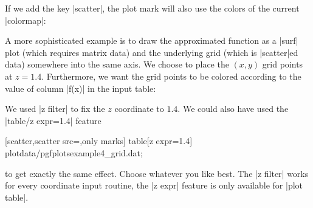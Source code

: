 {If we add the key |scatter|, the plot mark will also use the colors of the current |colormap|:
\pgfplotsexpensiveexample
\begin{codeexample}[]
\end{codeexample}

A more sophisticated example is to draw the approximated function as a |surf| plot (which requires matrix data) and the underlying grid (which is |scatter|ed data) somewhere into the same axis. We choose to place the $(x,y)$ grid points at $z=1.4$. Furthermore, we want the grid points to be colored according to the value of column |f(x)| in the input table:
\pgfplotsexpensiveexample
\begin{codeexample}[]
\end{codeexample}
\noindent We used |z filter| to fix the $z$ coordinate to $1.4$. We could also have used the |table/z expr=1.4| feature
\begin{codeexample}
	[scatter,scatter src=,only marks] 
		table[z expr=1.4] {plotdata/pgfplotsexample4_grid.dat};
\end{codeexample}
\noindent to get exactly the same effect. Choose whatever you like best. The |z filter| works for every coordinate input routine, the |z expr| feature is only available for |plot table|.


}
